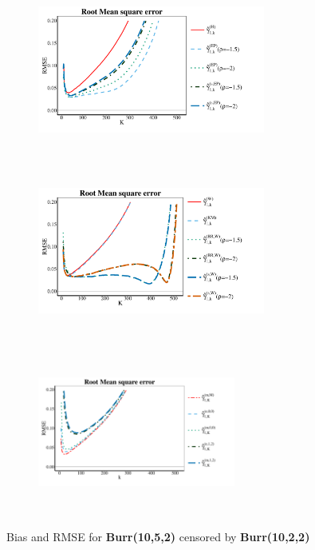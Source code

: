 \begin{landscape}
\begin{figure}[h]
\begin{subfigure}[h]{0.3\linewidth}
		\includegraphics[width=7.5cm,height=5.5cm]{./plots/paper2/RMSE_simulations_B21_H.pdf}
	\end{subfigure}
	\hspace{\fill}
	\begin{subfigure}[h]{0.3\linewidth}
		\includegraphics[width=7.5cm,height=5.5cm]{./plots/paper2/RMSE_simulations_B21_W.pdf}
	\end{subfigure}
	\hspace{\fill}
	\begin{subfigure}[h]{0.3\linewidth}
		\includegraphics[width=6.5cm,height=5.5cm]{./plots/paper2/RMSE_simulations_B21_B.pdf}
	\end{subfigure}
	\caption{Bias and RMSE for \textbf{Burr(10,5,2)} censored by \textbf{Burr(10,2,2)}}
\label{paper2:fig3}
\end{figure}






\end{landscape}
